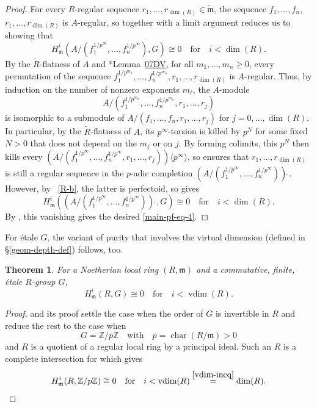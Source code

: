 \documentclass[11pt, reqno]{amsart}
\newcommand{\bZ}{\mathbb{Z}}
\newcommand{\fm}{\mathfrak{m}}
\DeclareMathOperator{\Char}{char}		%
\DeclareMathOperator{\vdim}{vdim}		%
\newcommand{\wh}{\widehat}
\newcommand{\wt}{\widetilde}
\newcommand{\lab}{\label}
\newcommand{\x}{\text}
\providecommand{\qxq}[1]{\quad\text{#1}\quad}
\newcommand{\q}{\quad}
\newcommand{\tst}{\textstyle}
\newcommand{\be}{\begin{equation}}
\newcommand{\ee}{\end{equation}}
\newcommand{\bpf}{\begin{proof}}
\newcommand{\epf}{\end{proof}}
\newcommand{\bthm}{\begin{thm}}
\newcommand{\ethm}{\end{thm}}
\numberwithin{equation}{numberingbase}
\theoremstyle{thms}
\newtheorem{thm}[numberingbase]{Theorem}
\theoremstyle{claims}
\theoremstyle{defs}
\theoremstyle{thms}
\theoremstyle{defs}
\theoremstyle{subsection-tweak}
\theoremstyle{subsection-tweak}
\begin{document}
\begin{proof}
For every $R$-regular sequence $r_1, \dotsc, r_{\dim(R)} \in \wt{\fm}$, the sequence $f_1, \dotsc, f_n$, $r_1, \dotsc, r_{\dim(R)}$ is $A$-regular, so  together with a limit argument reduces us to showing that 
\be \label{main-pf-eq-4}
H^i_\fm(A/(f_1^{1/p^\infty}, \dotsc, f_n^{1/p^\infty}), G) \cong 0 \q \x{for} \q i < \dim(R).
\ee
By the $\wt{R}$-flatness of $A$ and \cite{SP}*{Lemma~\href{https://stacks.math.columbia.edu/tag/07DV}{07DV}}, for all $m_1, \dotsc, m_n \ge 0$, every permutation of the sequence $f_1^{1/p^{m_1}}, \dotsc, f_n^{1/p^{m_n}}, r_1, \dotsc, r_{\dim(R)}$ is $A$-regular. Thus, by induction on the number of nonzero exponents $m_\ell$, the $A$-module 
\[
\tst A/(f_1^{1/p^{m_1}}, \dotsc, f_n^{1/p^{m_n}}, r_1, \dotsc, r_{j})
\]
is isomorphic to a submodule of $A/(f_1, \dotsc, f_n, r_1, \dotsc, r_j)$ for $j = 0, \dotsc, \dim(R)$. In particular, by the $\wt{R}$-flatness of $A$, its $p^\infty$-torsion is killed by $p^N$ for some fixed $N > 0$ that does not depend on the $m_\ell$ or on $j$. By forming colimits, this $p^N$ then kills every $(A/(f_1^{1/p^\infty}, \dotsc, f_n^{1/p^\infty}, r_1, \dotsc, r_j))\langle p^\infty\rangle$, so  ensures that $r_1, \dotsc, r_{\dim(R)}$ is still a regular sequence in the $p$-adic completion $(A/(f_1^{1/p^\infty}, \dotsc, f_n^{1/p^\infty}))\wh{\ }$. However, by ~\ref{R-b}, the latter is perfectoid, so  gives
\[
H^i_\fm((A/(f_1^{1/p^\infty}, \dotsc, f_n^{1/p^\infty}))\wh{\ }, G) \cong 0 \q \x{for} \q i < \dim(R).
\]
By , %
this vanishing gives the desired \eqref{main-pf-eq-4}.
\end{proof}




For \'{e}tale $G$, the variant of purity that involves the virtual dimension (defined in \S\ref{geom-depth-def}) follows, too.


\bthm \lab{ell-semipurity-p}
For a Noetherian local ring $(R, \fm)$ and a commutative, finite, \'{e}tale $R$-group $G$,
\[
H^i_\fm(R, G) \cong 0 \q \text{for} \q i < \vdim(R).
\]
\ethm

\bpf
{} and its proof settle the case when the order of $G$ is invertible in $R$ and reduce the rest to the case when 
\[
G = \bZ/p\bZ \qxq{with} p = \Char(R/\fm) > 0
\]
and $R$ is a quotient of a regular local ring by a principal ideal. Such an $R$ is a complete intersection for which  gives
\[
H^i_\fm(R, \bZ/p\bZ) \cong 0 \qxq{for} i < \vdim(R) \overset{\eqref{vdim-ineq}}{=} \dim(R). \qedhere
\]
\epf
\end{document}
